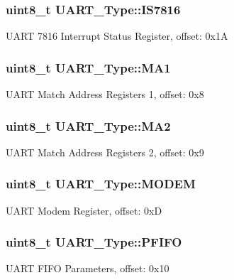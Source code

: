 \subsubsection[{\texorpdfstring{I\+S7816}{IS7816}}]{ uint8\+\_\+t U\+A\+R\+T\+\_\+\+Type\+::\+I\+S7816}\hypertarget{structUART__Type_a3ad7c2421ffeffae79c6c92b40d4751c}{}\label{structUART__Type_a3ad7c2421ffeffae79c6c92b40d4751c}
U\+A\+RT 7816 Interrupt Status Register, offset\+: 0x1A 
\subsubsection[{\texorpdfstring{M\+A1}{MA1}}]{ uint8\+\_\+t U\+A\+R\+T\+\_\+\+Type\+::\+M\+A1}\hypertarget{structUART__Type_a73acabe00975b26ce347736f07c80925}{}\label{structUART__Type_a73acabe00975b26ce347736f07c80925}
U\+A\+RT Match Address Registers 1, offset\+: 0x8 
\subsubsection[{\texorpdfstring{M\+A2}{MA2}}]{ uint8\+\_\+t U\+A\+R\+T\+\_\+\+Type\+::\+M\+A2}\hypertarget{structUART__Type_a32e576e5777a71fe5d082448e7a452ed}{}\label{structUART__Type_a32e576e5777a71fe5d082448e7a452ed}
U\+A\+RT Match Address Registers 2, offset\+: 0x9 
\subsubsection[{\texorpdfstring{M\+O\+D\+EM}{MODEM}}]{ uint8\+\_\+t U\+A\+R\+T\+\_\+\+Type\+::\+M\+O\+D\+EM}\hypertarget{structUART__Type_af9d2946e7652e7f1a1bf56fa019ffaf0}{}\label{structUART__Type_af9d2946e7652e7f1a1bf56fa019ffaf0}
U\+A\+RT Modem Register, offset\+: 0xD 
\subsubsection[{\texorpdfstring{P\+F\+I\+FO}{PFIFO}}]{ uint8\+\_\+t U\+A\+R\+T\+\_\+\+Type\+::\+P\+F\+I\+FO}\hypertarget{structUART__Type_acd53b65af524f9b87c0dc07ccfb922cc}{}\label{structUART__Type_acd53b65af524f9b87c0dc07ccfb922cc}
U\+A\+RT F\+I\+FO Parameters, offset\+: 0x10 
